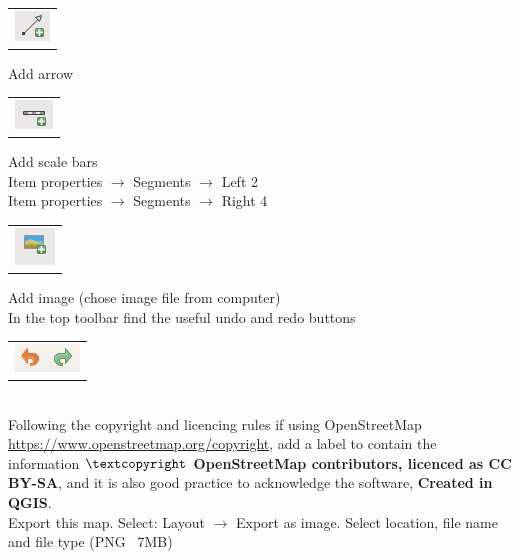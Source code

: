 \begin{tabular}{@{}c@{}}\includegraphics[width=4ex]{images/add_arrow_icon.png}\end{tabular}
Add arrow

\begin{tabular}{@{}c@{}}\includegraphics[width=4ex]{images/add_scale_bars_icon.png}\end{tabular}
Add scale bars\\
Item properties $\rightarrow$ Segments $\rightarrow$ Left 2\\
Item properties $\rightarrow$ Segments $\rightarrow$ Right 4

\begin{tabular}{@{}c@{}}\includegraphics[width=4ex]{images/add_image_icon.png}\end{tabular}
Add image (chose image file from computer)\\

In the top toolbar find the useful undo and redo buttons \begin{tabular}{@{}c@{}}\includegraphics[width=4ex]{images/undo_redo_layout_icons.png}\end{tabular}\\


Following the copyright and licencing rules if using OpenStreetMap \url{https://www.openstreetmap.org/copyright}, add a label to contain the information \textbf{${\textcopyright}$ OpenStreetMap contributors, licenced as CC BY-SA}, and it is also good practice to acknowledge the software, \textbf{Created in QGIS}.\\


Export this map.  Select: Layout $\rightarrow$ Export as image. Select location, file name and file type (PNG ~7MB)



